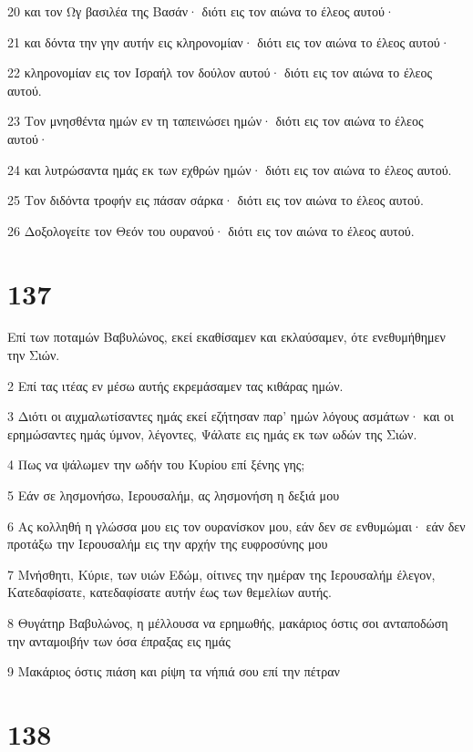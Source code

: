 \par 20 και τον Ωγ βασιλέα της Βασάν· διότι εις τον αιώνα το έλεος αυτού·
\par 21 και δόντα την γην αυτήν εις κληρονομίαν· διότι εις τον αιώνα το έλεος αυτού·
\par 22 κληρονομίαν εις τον Ισραήλ τον δούλον αυτού· διότι εις τον αιώνα το έλεος αυτού.
\par 23 Τον μνησθέντα ημών εν τη ταπεινώσει ημών· διότι εις τον αιώνα το έλεος αυτού·
\par 24 και λυτρώσαντα ημάς εκ των εχθρών ημών· διότι εις τον αιώνα το έλεος αυτού.
\par 25 Τον διδόντα τροφήν εις πάσαν σάρκα· διότι εις τον αιώνα το έλεος αυτού.
\par 26 Δοξολογείτε τον Θεόν του ουρανού· διότι εις τον αιώνα το έλεος αυτού.

\chapter{137}

\par Επί των ποταμών Βαβυλώνος, εκεί εκαθίσαμεν και εκλαύσαμεν, ότε ενεθυμήθημεν την Σιών.
\par 2 Επί τας ιτέας εν μέσω αυτής εκρεμάσαμεν τας κιθάρας ημών.
\par 3 Διότι οι αιχμαλωτίσαντες ημάς εκεί εζήτησαν παρ' ημών λόγους ασμάτων· και οι ερημώσαντες ημάς ύμνον, λέγοντες, Ψάλατε εις ημάς εκ των ωδών της Σιών.
\par 4 Πως να ψάλωμεν την ωδήν του Κυρίου επί ξένης γης;
\par 5 Εάν σε λησμονήσω, Ιερουσαλήμ, ας λησμονήση η δεξιά μου
\par 6 Ας κολληθή η γλώσσα μου εις τον ουρανίσκον μου, εάν δεν σε ενθυμώμαι· εάν δεν προτάξω την Ιερουσαλήμ εις την αρχήν της ευφροσύνης μου
\par 7 Μνήσθητι, Κύριε, των υιών Εδώμ, οίτινες την ημέραν της Ιερουσαλήμ έλεγον, Κατεδαφίσατε, κατεδαφίσατε αυτήν έως των θεμελίων αυτής.
\par 8 Θυγάτηρ Βαβυλώνος, η μέλλουσα να ερημωθής, μακάριος όστις σοι ανταποδώση την ανταμοιβήν των όσα έπραξας εις ημάς
\par 9 Μακάριος όστις πιάση και ρίψη τα νήπιά σου επί την πέτραν

\chapter{138}

